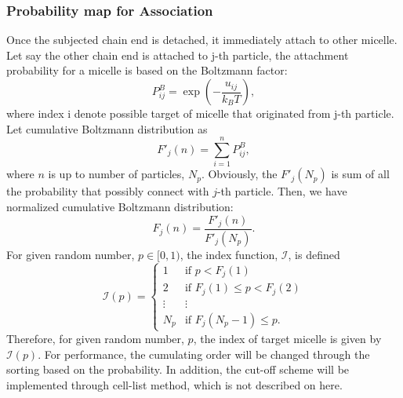 \documentclass[10pt, a4paper]{article}
\begin{document}
\subsubsection{Probability map for Association}
Once the subjected chain end is detached, it immediately attach to other micelle. Let say the other chain end is attached to j-th particle, the attachment probability for a micelle is based on the Boltzmann factor:
\begin{equation}
P^{B}_{ij} = \exp\left(-\frac{{u}_{ij}}{k_BT}\right),
\end{equation}
where index i denote possible target of micelle that originated from j-th particle. 
Let cumulative Boltzmann distribution as
\begin{equation}
F'_j(n) = \sum_{i=1}^{n}P^{B}_{ij},
\end{equation}
where $n$ is up to number of particles, $N_p$. Obviously, the $F'_j(N_p)$ is sum of all the probability that possibly connect with $j$-th particle. Then, we have normalized cumulative Boltzmann distribution:
\begin{equation}
F_j(n) = \frac{F'_j(n)}{F'_j(N_p)}.
\end{equation}
For given random number, $p\in[0, 1)$, the index function, $\mathscr{I}$, is defined 
\begin{equation}
\mathscr{I}(p) = \left\{\begin{array}{cc} 1 & \textrm{if }  p < F_j(1) \\
2 & \textrm{if } F_j(1) \leq p < F_j(2) \\
\vdots & \vdots \\
N_p & \textrm{if } F_j(N_p - 1) \leq p.
\end{array}\right.
\end{equation}
Therefore, for given random number, $p$, the index of target micelle is given by $\mathscr{I}(p)$. For performance, the cumulating order will be changed through the sorting based on the probability. In addition, the cut-off scheme will be implemented through cell-list method, which is not described on here.
\end{document}
